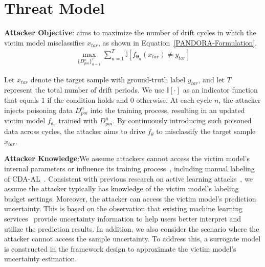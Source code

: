 \section{Threat Model}
\label{Sec: Threat Model}
\textbf{Attacker Objective}: \pandora aims to maximize the number of drift cycles in which the victim model misclassifies $x_{tar}$, as shown in Equation~\ref{PANDORA-Formulation}.
\begin{equation}
	\begin{aligned}
			\max_{ \{ D_{poi}^{n} \}_{n=1}^{T} } \sum_{n=1}^{T} \mathbb{I}[ f_{\bm{\theta}_{n}}(x_{tar}) \neq y_{tar} ]
	\end{aligned}
	\label{PANDORA-Formulation}
\end{equation}

Let $x_{tar}$ denote the target sample with ground-truth label $y_{tar}$, and let $T$ represent the total number of drift periods.
We use $\mathbb{I}[\cdot]$ as an indicator function that equals $1$ if the condition holds and $0$ otherwise.
At each cycle $n$, the attacker injects poisoning data $D_{poi}^{n}$ into the training process, resulting in an updated victim model $f_{\theta_{n}}$ trained with $D_{poi}^{n}$.
By continuously introducing such poisoned data across cycles, the attacker aims to drive $f_{\theta}$ to misclassify the target sample $x_{tar}$.

\textbf{Attacker Knowledge}:We assume attackers cannot access the victim model's internal parameters or influence its training process~\cite{2017-ASIACCS-Black-Box-Attack}, including manual labeling of CDA-AL~\cite{2023-Usenix-chenyizhen}.
Consistent with previous research on active learning attacks~\cite{2021-Usenix-active-learning-backdoor}, we assume the attacker typically has knowledge of the victim model's labeling budget settings.
Moreover, the attacker can access the victim model’s prediction uncertainty.
This is based on the observation that existing machine learning services~\cite{2025-Baidu-Image-Recognition} provide uncertainty information to help users better interpret and utilize the prediction results.
In addition, we also consider the scenario where the attacker cannot access the sample uncertainty. To address this, a surrogate model is constructed in the framework design to approximate the victim model’s uncertainty estimation.


